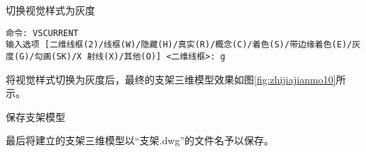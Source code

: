 \begin{procedure}
\begin{figure}[htbp]
\centering
\begin{floatrow}[2]
\end{floatrow}
\end{figure}
\item 切换视觉样式为灰度


\begin{lstlisting}
命令: VSCURRENT
输入选项 [二维线框(2)/线框(W)/隐藏(H)/真实(R)/概念(C)/着色(S)/带边缘着色(E)/灰度(G)/勾画(SK)/X 射线(X)/其他(O)] <二维线框>: g
\end{lstlisting}

将视觉样式切换为灰度后，最终的支架三维模型效果如图\ref{fig:zhijiajianmo10}所示。
\item 保存支架模型

最后将建立的支架三维模型以“支架.dwg”的文件名予以保存。

\end{procedure}

\endinput